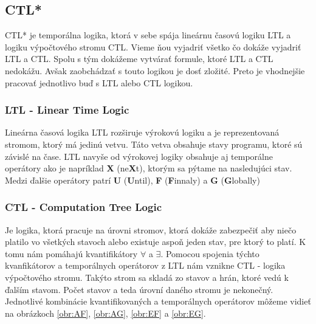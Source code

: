 \subsection{CTL*}
CTL* je temporálna logika, ktorá v sebe spája lineárnu časovú logiku LTL a 
logiku výpočtového stromu CTL. Vieme ňou vyjadriť všetko čo dokáže vyjadriť LTL a CTL. Spolu s tým
dokážeme vytvárať formule, ktoré LTL a CTL nedokážu. Avšak zaobchádzať s touto logikou je dosť zložité.
Preto je vhodnejšie pracovať jednotlivo buď s LTL alebo CTL logikou.

\subsubsection{LTL - Linear Time Logic}
Lineárna časová logika LTL rozširuje výrokovú logiku a je reprezentovaná stromom, ktorý má jedinú vetvu.
Táto vetva obsahuje stavy programu, ktoré sú závislé na čase. LTL navyše od výrokovej logiky obsahuje 
aj temporálne operátory ako je napríklad \textbf{X} (ne\textbf{X}t), ktorým sa pýtame na nasledujúci
stav. Medzi ďalšie operátory patrí \textbf{U} (\textbf{U}ntil), \textbf{F} (\textbf{F}innaly) a
\textbf{G} (\textbf{G}lobally) 


\subsubsection{CTL - Computation Tree Logic}
Je logika, ktorá pracuje na úrovni stromov, ktorá dokáže zabezpečiť aby niečo platilo vo všetkých 
stavoch alebo existuje aspoň jeden stav, pre ktorý to platí. K tomu nám pomáhajú kvantifikátory 
$\forall$ a $\exists$. Pomocou spojenia týchto kvanfikátorov a temporálnych operátorov z LTL 
nám vznikne CTL - logika výpočtového stromu. Takýto strom sa skladá zo stavov a hrán, ktoré vedú k
ďalším stavom. Počet stavov a teda úrovní daného stromu je nekonečný. Jednotlivé kombinácie kvantifikovaných
a temporálnych operátorov môžeme vidieť na obrázkoch \ref{obr:AF}, \ref{obr:AG}, \ref{obr:EF} a \ref{obr:EG}.


